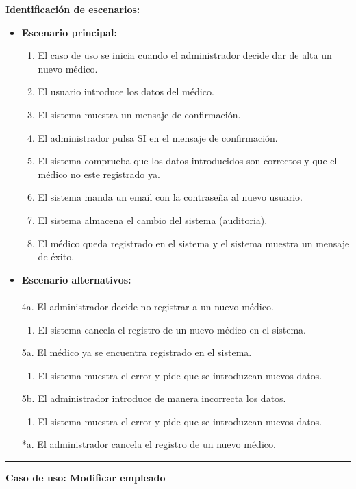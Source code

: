 \underline{\textbf{Identificación de escenarios:}}
\begin{itemize}\renewcommand{\labelitemi}{$\circ$}
 \item \textbf{Escenario principal:}
         \begin{enumerate}
          \item El caso de uso se inicia cuando el administrador decide dar de alta un nuevo médico.
          \item El usuario introduce los datos del médico.
  	  \item El sistema muestra un mensaje de confirmación.
          \item El administrador pulsa SI en el mensaje de confirmación.
          \item El sistema comprueba que los datos introducidos son correctos y que el médico no este registrado ya.
	\item El sistema manda un email con la contraseña al nuevo usuario.
 	  \item El sistema almacena el cambio del sistema (auditoria).
          \item El médico queda registrado en el sistema y el sistema muestra un mensaje de éxito.
         \end{enumerate}
  \item \textbf{Escenario alternativos:}\\\\
	4a. El administrador decide no registrar a un nuevo médico.
	      \begin{enumerate}
	       \item El sistema cancela el registro de un nuevo médico en el sistema.
	      \end{enumerate}
         5a. El médico ya se encuentra registrado en el sistema.
	      \begin{enumerate}
	       \item El sistema muestra el error y pide que se introduzcan nuevos datos.
	      \end{enumerate}
           5b. El administrador introduce de manera incorrecta los datos.
		\begin{enumerate}
		 \item El sistema muestra el error y pide que se introduzcan nuevos datos.
		\end{enumerate}
          *a. El administrador cancela el registro de un nuevo médico.
\end{itemize}
\smallskip
\hrule height 1pt
\smallskip
\textbf{Caso de uso: Modificar empleado}
